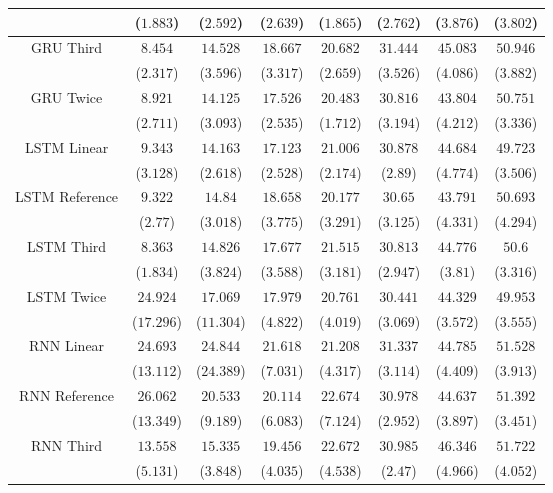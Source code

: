 \begin{table}[!ht]
{\begin{tabular}{|c|c|c|c|c|c|c|c|}
			 & ($1.883$) & ($2.592$) & ($2.639$) & ($1.865$) & ($2.762$) & ($3.876$) & ($3.802$) \\ \hline
			\multirow{2}{*}{GRU Third} & $8.454$ & $14.528$ & $18.667$ & $20.682$ & $31.444$ & $45.083$ & $50.946$ \\
			 & ($2.317$) & ($3.596$) & ($3.317$) & ($2.659$) & ($3.526$) & ($4.086$) & ($3.882$) \\ \hline
			\multirow{2}{*}{GRU Twice} & $8.921$ & $14.125$ & $17.526$ & $20.483$ & $30.816$ & $43.804$ & $50.751$ \\
			 & ($2.711$) & ($3.093$) & ($2.535$) & ($1.712$) & ($3.194$) & ($4.212$) & ($3.336$) \\ \hline
			\multirow{2}{*}{LSTM Linear} & $9.343$ & $14.163$ & $17.123$ & $21.006$ & $30.878$ & $44.684$ & $49.723$ \\
			 & ($3.128$) & ($2.618$) & ($2.528$) & ($2.174$) & ($2.89$) & ($4.774$) & ($3.506$) \\ \hline
			\multirow{2}{*}{LSTM Reference} & $9.322$ & $14.84$ & $18.658$ & $20.177$ & $30.65$ & $43.791$ & $50.693$ \\
			 & ($2.77$) & ($3.018$) & ($3.775$) & ($3.291$) & ($3.125$) & ($4.331$) & ($4.294$) \\ \hline
			\multirow{2}{*}{LSTM Third} & $8.363$ & $14.826$ & $17.677$ & $21.515$ & $30.813$ & $44.776$ & $50.6$ \\
			 & ($1.834$) & ($3.824$) & ($3.588$) & ($3.181$) & ($2.947$) & ($3.81$) & ($3.316$) \\ \hline
			\multirow{2}{*}{LSTM Twice} & $24.924$ & $17.069$ & $17.979$ & $20.761$ & $30.441$ & $44.329$ & $49.953$ \\
			 & ($17.296$) & ($11.304$) & ($4.822$) & ($4.019$) & ($3.069$) & ($3.572$) & ($3.555$) \\ \hline
			\multirow{2}{*}{RNN Linear} & $24.693$ & $24.844$ & $21.618$ & $21.208$ & $31.337$ & $44.785$ & $51.528$ \\
			 & ($13.112$) & ($24.389$) & ($7.031$) & ($4.317$) & ($3.114$) & ($4.409$) & ($3.913$) \\ \hline
			\multirow{2}{*}{RNN Reference} & $26.062$ & $20.533$ & $20.114$ & $22.674$ & $30.978$ & $44.637$ & $51.392$ \\
			 & ($13.349$) & ($9.189$) & ($6.083$) & ($7.124$) & ($2.952$) & ($3.897$) & ($3.451$) \\ \hline
			\multirow{2}{*}{RNN Third} & $13.558$ & $15.335$ & $19.456$ & $22.672$ & $30.985$ & $46.346$ & $51.722$ \\
			 & ($5.131$) & ($3.848$) & ($4.035$) & ($4.538$) & ($2.47$) & ($4.966$) & ($4.052$) \\ \hline

\end{tabular}}
\end{table}
